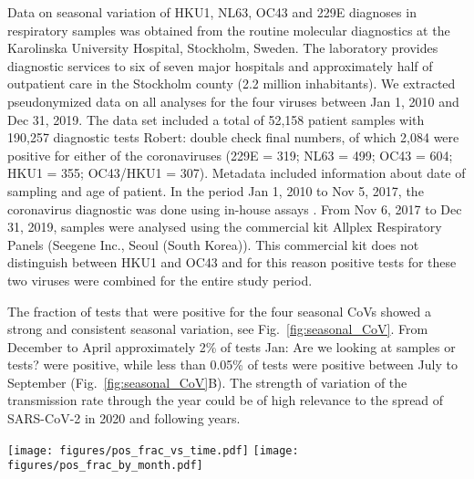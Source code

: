 \documentclass[rmp, reprint, superscriptaddress, floatfix,amsmath]{revtex4-1}
\newcommand{\Robert}[1]{{\color{celestialblue}Robert: #1}}
\newcommand{\Jan}[1]{{\color{deepsaffron}Jan: #1}}
\begin{document}
Data on seasonal variation of HKU1, NL63, OC43 and 229E diagnoses in respiratory samples was obtained from the routine molecular diagnostics at the Karolinska University Hospital, Stockholm, Sweden. The laboratory provides diagnostic services to six of seven major hospitals and approximately half of outpatient care in the Stockholm county (2.2 million inhabitants). We extracted pseudonymized data on all analyses for the four viruses between Jan 1, 2010 and Dec 31, 2019. The data set included a total of 52,158 patient samples with 190,257 diagnostic tests \Robert{double check final numbers}, of which 2,084 were positive for either of the coronaviruses (229E = 319; NL63 = 499; OC43 = 604; HKU1 = 355; OC43/HKU1 = 307). Metadata included information about date of sampling and age of patient. 
In the period Jan 1, 2010 to Nov 5, 2017, the coronavirus diagnostic was done using in-house assays \citep{tiveljung2009development}. From Nov 6, 2017 to Dec 31, 2019, samples were analysed using the commercial kit Allplex Respiratory Panels (Seegene Inc., Seoul (South Korea)). This commercial kit does not distinguish between HKU1 and OC43 and for this reason positive tests for these two viruses were combined for the entire study period. 

The fraction of tests that were positive for the four seasonal CoVs showed a strong and consistent seasonal variation, see Fig.~\ref{fig:seasonal_CoV}. 
From December to April approximately 2\%  of tests \Jan{Are we looking at samples or tests?
} were positive, while less than 0.05\% of tests were positive between July to September (Fig.~\ref{fig:seasonal_CoV}B).
The strength of variation of the transmission rate through the year could be of high relevance to the spread of SARS-CoV-2 in 2020 and following years. 

\begin{figure*}
    \centering
    \texttt{[image: figures/pos\_frac\_vs\_time.pdf]}
    \texttt{[image: figures/pos\_frac\_by\_month.pdf]}
    \caption{Seasonal variation in fraction of positive CoV test in Stockholm, Sweden.}
    \label{fig:seasonal_CoV}
\end{figure*}
\end{document}

